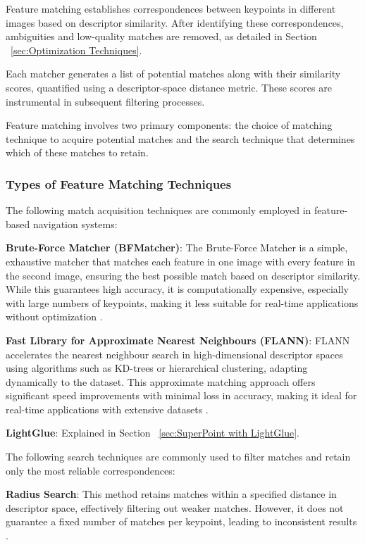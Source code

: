 Feature matching establishes correspondences between keypoints in different images based on descriptor similarity. After identifying these correspondences, ambiguities and low-quality matches are removed, as detailed in Section ~\ref{sec:Optimization Techniques}. 

Each matcher generates a list of potential matches along with their similarity scores, quantified using a descriptor-space distance metric. These scores are instrumental in subsequent filtering processes.

Feature matching involves two primary components: the choice of matching technique to acquire potential matches and the search technique that determines which of these matches to retain. 

\subsubsection{Types of Feature Matching Techniques}

The following match acquisition techniques are commonly employed in feature-based navigation systems:

\textbf{Brute-Force Matcher (BFMatcher)}: The Brute-Force Matcher is a simple, exhaustive matcher that matches each feature in one image with every feature in the second image, ensuring the best possible match based on descriptor similarity. While this guarantees high accuracy, it is computationally expensive, especially with large numbers of keypoints, making it less suitable for real-time applications without optimization \cite{opencv_bfmatcher}.

\textbf{Fast Library for Approximate Nearest Neighbours (FLANN)}: FLANN accelerates the nearest neighbour search in high-dimensional descriptor spaces using algorithms such as KD-trees or hierarchical clustering, adapting dynamically to the dataset. This approximate matching approach offers significant speed improvements with minimal loss in accuracy, making it ideal for real-time applications with extensive datasets \cite{muja2014scalable}.

\textbf{LightGlue}: Explained in Section ~\ref{sec:SuperPoint with LightGlue}.


The following search techniques are commonly used to filter matches and retain only the most reliable correspondences:

\textbf{Radius Search}: This method retains matches within a specified distance in descriptor space, effectively filtering out weaker matches. However, it does not guarantee a fixed number of matches per keypoint, leading to inconsistent results \cite{opencv_matcher_tutorial}.

